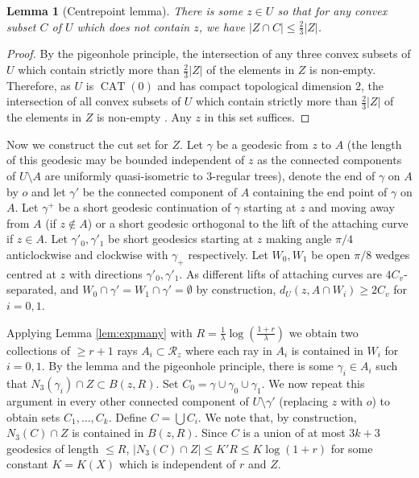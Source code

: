 \documentclass[11pt]{amsart}
\numberwithin{equation}{section}
\newtheorem{lemma}[equation]{Lemma}
\theoremstyle{citing}
\DeclareMathOperator{\CAT}{CAT}
\numberwithin{equation}{section}
\begin{document}
\begin{lemma}[Centrepoint lemma] There is some $z\in U$ so that for any convex subset $C$ of $U$ which does not contain $z$, we have $|Z\cap C|\leq \frac23|Z|$.
\end{lemma}
\begin{proof}
	By the pigeonhole principle, the intersection of any three convex subsets of $U$ which contain strictly more than $\frac23|Z|$ of the elements in $Z$ is non-empty. Therefore, as $U$ is $\CAT(0)$ and has compact topological dimension $2$, the intersection of all convex subsets of $U$ which contain strictly more than $\frac23|Z|$ of the elements in $Z$ is non-empty \cite[Proposition 5.3]{Kleiner-length-space}. Any $z$ in this set suffices.
\end{proof}

Now we construct the cut set for $Z$. Let $\gamma$ be a geodesic from $z$ to $A$ (the length of this geodesic may be bounded independent of $z$ as the connected components of $U\setminus A$ are uniformly quasi-isometric to $3$-regular trees), denote the end of $\gamma$ on $A$ by $o$ and let $\gamma'$ be the connected component of $A$ containing the end point of $\gamma$ on $A$. Let $\gamma^+$ be a short geodesic continuation of $\gamma$ starting at $z$ and moving away from $A$ (if $z\not\in A$) or a short geodesic orthogonal to the lift of the attaching curve if $z\in A$. Let $\gamma'_0,\gamma'_1$ be short geodesics starting at $z$ making angle $\pi/4$ anticlockwise and clockwise with $\gamma_+$ respectively. Let $W_0,W_1$ be open $\pi/8$ wedges centred at $z$ with directions $\gamma'_0,\gamma'_1$. As different lifts of attaching curves are $4C_v$-separated, and $W_0\cap \gamma'=W_1\cap \gamma'=\emptyset$ by construction, $d_U(z,A\cap W_i)\geq 2C_v$ for $i=0,1$.

Applying Lemma \ref{lem:expmany} with $R=\frac{1}{\lambda}\log(\frac{1+r}{\lambda})$ we obtain two collections of $\geq r+1$ rays $A_i\subset\mathcal R_z$ where each ray in $A_i$ is contained in $W_i$ for $i=0,1$.  By the lemma and the pigeonhole principle, there is some $\gamma_i\in A_i$ such that $N_3(\gamma_i)\cap Z\subset B(z,R)$. Set $C_0=\gamma\cup\gamma_0\cup\gamma_1$. We now repeat this argument in every other connected component of $U\setminus\gamma'$ (replacing $z$ with $o$) to obtain sets $C_1,\ldots,C_k$. Define $C=\bigcup C_i$. We note that, by construction, $N_3(C)\cap Z$ is contained in $B(z,R)$. Since $C$ is a union of at most $3k+3$ geodesics of length $\leq R$, $|N_3(C)\cap Z|\leq K'R \leq K\log(1+r)$ for some constant $K=K(X)$ which is independent of $r$ and $Z$.
\end{document}
